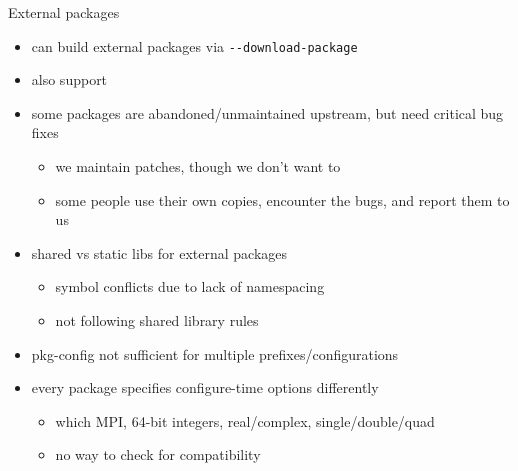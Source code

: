 \documentclass{beamer}
\begin{document}
\begin{frame}{External packages}
  \begin{itemize}
  \item can build external packages via \texttt{-{}-download-package}
  \item also support 
  \item some packages are abandoned/unmaintained upstream, but need critical bug fixes
    \begin{itemize}
    \item we maintain patches, though we don't want to
    \item some people use their own copies, encounter the bugs, and report them to us
    \end{itemize}
  \item shared vs static libs for external packages
    \begin{itemize}
    \item symbol conflicts due to lack of namespacing
    \item not following shared library rules
    \end{itemize}
  \item pkg-config not sufficient for multiple prefixes/configurations
  \item every package specifies configure-time options differently
    \begin{itemize}
    \item which MPI, 64-bit integers, real/complex, single/double/quad
    \item no way to check for compatibility
    \end{itemize}
  \end{itemize}
\end{frame}
\end{document}
